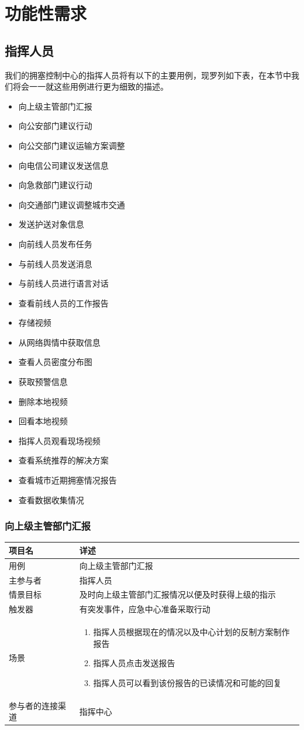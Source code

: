 \documentclass{ctexrep}
\begin{document}
\section{功能性需求}
\subsection{指挥人员}
我们的拥塞控制中心的指挥人员将有以下的主要用例，现罗列如下表，在本节中我们将会一一就这些用例进行更为细致的描述。
\begin{itemize}
\item 向上级主管部门汇报
\item 向公安部门建议行动
\item 向公交部门建议运输方案调整
\item 向电信公司建议发送信息
\item 向急救部门建议行动
\item 向交通部门建议调整城市交通
\item 发送护送对象信息
\item 向前线人员发布任务
\item 与前线人员发送消息
\item 与前线人员进行语言对话
\item 查看前线人员的工作报告
\item 存储视频
\item 从网络舆情中获取信息
\item 查看人员密度分布图
\item 获取预警信息
\item 删除本地视频
\item 回看本地视频
\item 指挥人员观看现场视频
\item 查看系统推荐的解决方案
\item 查看城市近期拥塞情况报告
\item 查看数据收集情况 
\end{itemize}
\subsubsection{向上级主管部门汇报}
\begin{longtable}{p{2cm} | p{10cm}}
\hline
项目名 & 详述 \\
\hline
\hline
用例 & 向上级主管部门汇报\\
\hline
主参与者 & 指挥人员 \\
\hline
情景目标 &  及时向上级主管部门汇报情况以便及时获得上级的指示\\
\hline
触发器 & 有突发事件，应急中心准备采取行动\\
\hline
场景 & \begin{enumerate}
	\item 指挥人员根据现在的情况以及中心计划的反制方案制作报告
	\item 指挥人员点击发送报告
	\item 指挥人员可以看到该份报告的已读情况和可能的回复
\end{enumerate} \\
\hline
参与者的连接渠道 & 指挥中心 \\
\hline
\end{longtable}
\end{document}
